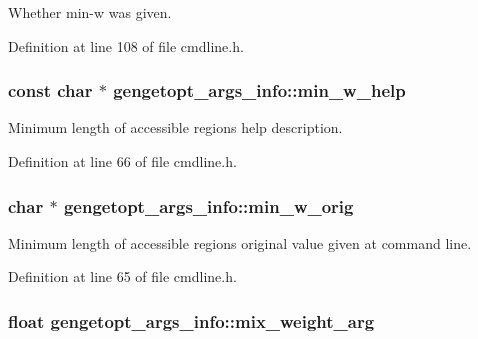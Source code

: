 Whether min-\/w was given. 



Definition at line 108 of file cmdline.\+h.

\hypertarget{structgengetopt__args__info_aaf033ec8b1593d0f2f6f6d28a9709622}{
\subsubsection[{min\+\_\+w\+\_\+help}]{\setlength{\rightskip}{0pt plus 5cm}const char $\ast$ gengetopt\+\_\+args\+\_\+info\+::min\+\_\+w\+\_\+help}}\label{structgengetopt__args__info_aaf033ec8b1593d0f2f6f6d28a9709622}


Minimum length of accessible regions help description. 



Definition at line 66 of file cmdline.\+h.

\hypertarget{structgengetopt__args__info_a65ff1a2d7368adda94e83864d5d8c399}{
\subsubsection[{min\+\_\+w\+\_\+orig}]{\setlength{\rightskip}{0pt plus 5cm}char $\ast$ gengetopt\+\_\+args\+\_\+info\+::min\+\_\+w\+\_\+orig}}\label{structgengetopt__args__info_a65ff1a2d7368adda94e83864d5d8c399}


Minimum length of accessible regions original value given at command line. 



Definition at line 65 of file cmdline.\+h.

\hypertarget{structgengetopt__args__info_a5453c7d90806e2c130485e8d45e4b2bb}{
\subsubsection[{mix\+\_\+weight\+\_\+arg}]{\setlength{\rightskip}{0pt plus 5cm}float gengetopt\+\_\+args\+\_\+info\+::mix\+\_\+weight\+\_\+arg}}\label{structgengetopt__args__info_a5453c7d90806e2c130485e8d45e4b2bb}


